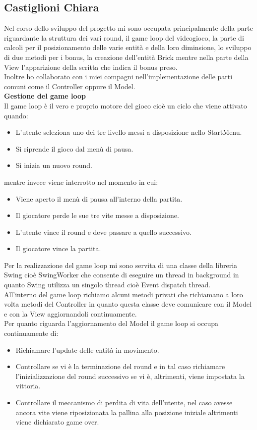 \documentclass[a4paper,12pt]{report}
\begin{document}
\pagebreak
\subsection{Castiglioni Chiara}
Nel corso dello sviluppo del progetto mi sono occupata principalmente della parte riguardante la struttura dei vari round, il game loop del videogioco,
la parte di calcoli per il posizionamento delle varie entità e della loro diminsione, lo sviluppo di due metodi per i bonus, la creazione dell'entità Brick
mentre nella parte della View l'apparizione della scritta che indica il bonus preso.\\Inoltre ho collaborato con i miei compagni nell'implementazione delle parti comuni come
il Controller oppure il Model.\\
\textbf{Gestione del game loop}
\\Il game loop è il vero e proprio motore del gioco cioè un ciclo che viene attivato quando:
\begin{itemize}
    \item L'utente seleziona uno dei tre livello messi a disposizione nello StartMenu.
    \item Si riprende il gioco dal menù di pausa.
    \item Si inizia un nuovo round.
\end{itemize}
mentre invece viene interrotto nel momento in cui:
\begin{itemize}
    \item Viene aperto il menù di pausa all'interno della partita.
    \item Il giocatore perde le sue tre vite messe a disposizione.
    \item L'utente vince il round e deve passare a quello successivo.
    \item Il giocatore vince la partita.
\end{itemize}
Per la realizzazione del game loop mi sono servita di una classe della libreria Swing cioè SwingWorker che consente di eseguire un thread in background
in quanto Swing utilizza un singolo thread cioè Event dispatch thread.
\\All'interno del game loop richiamo alcuni metodi privati che richiamano a loro volta metodi del Controller in quanto questa classe deve comunicare con il Model
e con la View aggiornandoli continuamente.
\\Per quanto riguarda l'aggiornamento del Model il game loop si occupa continuamente di:
\begin{itemize}
    \item Richiamare l'update delle entità in movimento.
    \item Controllare se vi è la terminazione del round e in tal caso richiamare l'inizializzazione del round successivo se vi è, altrimenti, viene impostata la vittoria.
    \item Controllare il meccanismo di perdita di vita dell'utente, nel caso avesse ancora vite viene riposizionata la pallina alla posizione iniziale altrimenti viene dichiarato game over.
\end{itemize}
\end{document}
